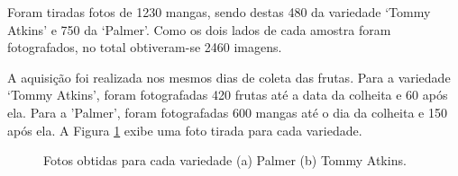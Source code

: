 Foram tiradas fotos de 1230 mangas, sendo destas 480 da variedade ‘Tommy Atkins’ e 750 da ‘Palmer’. Como os dois lados de cada amostra foram fotografados, no total obtiveram-se 2460 imagens.

A aquisição foi realizada nos mesmos dias de coleta das frutas. Para a variedade ‘Tommy Atkins’, foram fotografadas 420 frutas até a data da colheita e 60 após ela. Para a 'Palmer', foram fotografadas 600 mangas até o dia da colheita e 150 após ela. A Figura \ref{img:palmer_tommy} exibe uma foto tirada para cada variedade.

\begin{figure}[H]
\centering
    \caption{\label{img:palmer_tommy} Fotos obtidas para cada variedade (a) Palmer (b) Tommy Atkins.}

\end{figure}
